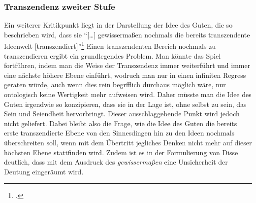 \subsubsection{Transzendenz zweiter Stufe}
Ein weiterer Kritikpunkt liegt in der Darstellung der Idee des Guten, die so beschrieben wird, dass sie \enquote{[\dots] gewissermaßen nochmals die bereits transzendente Ideenwelt [transzendiert]}\footcite[vgl.][S. 50]{DisseMetaphysik}
Einen transzendenten Bereich nochmals zu transzendieren ergibt ein grundlegendes Problem.
Man könnte das Spiel fortführen, indem man die Weise der Transzendenz immer weiterführt und immer eine nächste höhere Ebene einführt, wodruch man nur in einen infiniten Regress geraten würde, auch wenn dies rein begrfflich durchaus möglich wäre, nur ontologisch keine Wertigkeit mehr aufweisen wird. Daher müsste man die Idee des Guten irgendwie so konzipieren, dass sie in der Lage ist, ohne selbst zu sein, das Sein und Seiendheit hervorbringt. Dieser ausschlaggebende Punkt wird jedoch nicht geliefert. Dabei bleibt also die Frage, wie die Idee des Guten die bereits erste transzendierte Ebene von den Sinnesdingen hin zu den Ideen nochmals überschreiten soll, wenn mit dem Übertritt jegliches Denken nicht mehr auf dieser höchsten Ebene stattfinden wird. 
Zudem ist es in der Formulierung von Disse deutlich, dass mit dem Ausdruck des \emph{gewissermaßen} eine Unsicherheit der Deutung eingeräumt wird.

